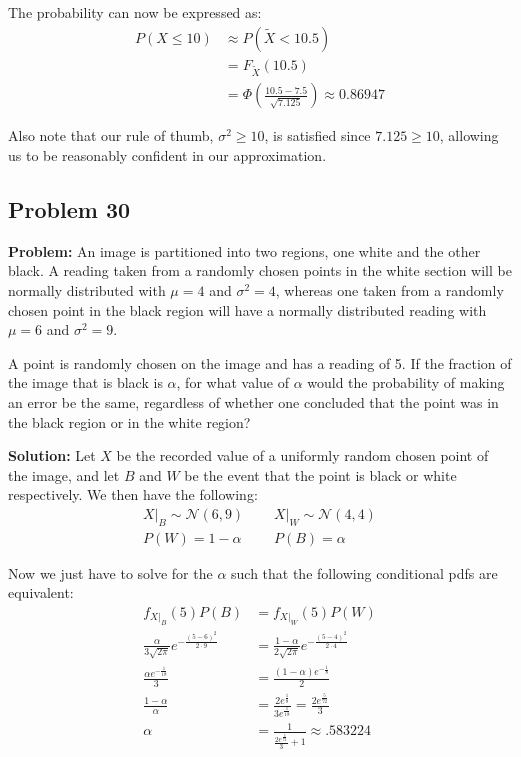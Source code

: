 \documentclass{article}
\begin{document}
The probability can now be expressed as:
\begin{align*}
    P(X\le10)&\approx P(\widetilde{X}<10.5)\tag{normal approximation \& continuity correction}\\
    &=F_{\widetilde{X}}(10.5)\tag{def. of cdf}\\
    &=\Phi\left(\frac{10.5-7.5}{\sqrt{7.125}}\right)\approx0.86947\tag{unit normal random variable}
\end{align*}

Also note that our rule of thumb, $\sigma^2\ge 10$, is satisfied since $7.125\ge 10$, allowing us to be reasonably confident in our approximation.

\subsection*{Problem 30}
\noindent\textbf{Problem:} An image is partitioned into two regions, one white and the other black. A reading taken from a randomly chosen points in the white section will be normally distributed with $\mu=4$ and $\sigma^2=4$, whereas one taken from a randomly chosen point in the black region will have a normally distributed reading with $\mu=6$ and $\sigma^2=9$.

A point is randomly chosen on the image and has a reading of 5. If the fraction of the image that is black is $\alpha$, for what value of $\alpha$ would the probability of making an error be the same, regardless of whether one concluded that the point was in the black region or in the white region?
\bigskip

\noindent\textbf{Solution:} Let $X$ be the recorded value of a uniformly random chosen point of the image, and let $B$ and $W$ be the event that the point is black or white respectively. We then have the following:
\begin{align*}
    X|_B\sim\mathcal N(6,9)\,\,\,\,&\,\,\,\,X|_W\sim\mathcal N(4,4)\\
    P(W)=1-\alpha\,\,\,\,&\,\,\,\,P(B)=\alpha
\end{align*}

Now we just have to solve for the $\alpha$ such that the following conditional pdfs are equivalent:
\begin{align*}
    f_{X|_B}(5)P(B)&=f_{X|_W}(5)P(W)\tag{equal prob of $W$ or $B$}\\
    \frac{\alpha}{3\sqrt{2\pi}}e^{-\frac{(5-6)^{2}}{2\cdot9}}&=\frac{1-\alpha}{2\sqrt{2\pi}}e^{-\frac{(5-4)^{2}}{2\cdot4}}\tag{pdf of normal distribution}\\
    \frac{\alpha e^{-\frac{1}{18}}}{3}&=\frac{(1-\alpha)e^{-\frac{1}{8}}}{2}\\
    \frac{1-\alpha}{\alpha}&=\frac{2e^{\frac{1}{8}}}{3e^{\frac{1}{18}}}=\frac{2e^{\frac{5}{72}}}{3}\\
    \alpha&=\frac{1}{\frac{2e^{\frac{5}{72}}}{3}+1}\approx.583224
\end{align*}
\end{document}
